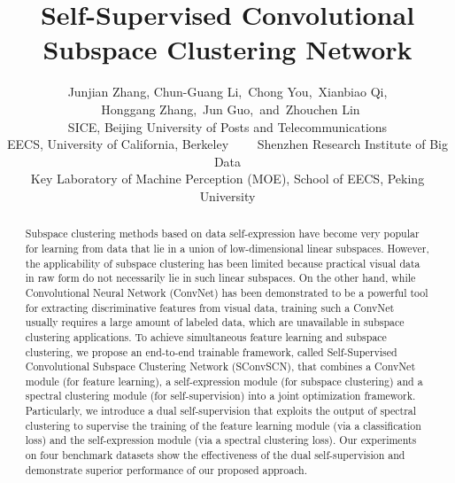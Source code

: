 \documentclass[10pt,twocolumn,letterpaper]{article}
\begin{document}
\title{Self-Supervised Convolutional Subspace Clustering Network}




\author{Junjian Zhang, Chun-Guang Li,~Chong You,~Xianbiao Qi,\\
~Honggang Zhang,~Jun Guo,~and~Zhouchen Lin\\
 SICE, Beijing University of Posts and Telecommunications \\
 EECS, University of California, Berkeley \ \ \ \  Shenzhen Research Institute of Big Data \\  Key Laboratory of Machine Perception (MOE), School of EECS, Peking University \\
}

\maketitle

\begin{abstract}

Subspace clustering methods based on data self-expression have become very popular for learning from data that lie in a union of low-dimensional linear subspaces. However, the applicability of subspace clustering has been limited because practical visual data in raw form do not necessarily lie in such linear subspaces. On the other hand, while Convolutional Neural Network (ConvNet) has been demonstrated to be a powerful tool for extracting discriminative features from visual data, training such a ConvNet usually requires a large amount of labeled data, which are unavailable in subspace clustering applications. To achieve simultaneous feature learning and subspace clustering, we propose an end-to-end trainable framework, called Self-Supervised Convolutional Subspace Clustering Network (SConvSCN), that combines a ConvNet module (for feature learning), a self-expression module (for subspace clustering) and a spectral clustering module (for self-supervision) into a joint optimization framework. Particularly, we introduce a dual self-supervision that exploits the output of spectral clustering to supervise the training of the feature learning module (via a classification loss) and the self-expression module (via a spectral clustering loss). Our experiments on four benchmark datasets show the effectiveness of the dual self-supervision and demonstrate superior performance of our proposed approach.

\end{abstract}
\end{document}
